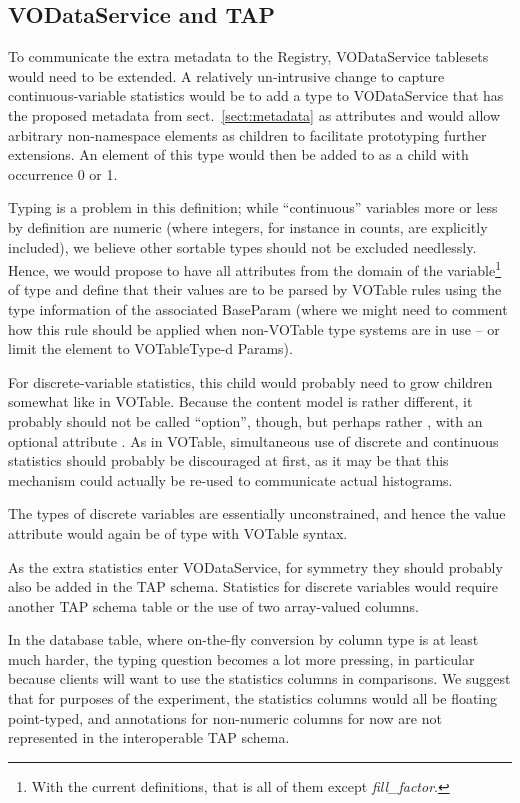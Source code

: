 \documentclass[11pt,a4paper]{ivoa}
\begin{document}
\subsection{VODataService and TAP}

To communicate the extra metadata to the Registry, VODataService
tablesets would need to be extended.  A relatively un-intrusive change
to capture continuous-variable statistics would be to add a type
 to VODataService that has the proposed metadata from
sect.~\ref{sect:metadata} as attributes and would allow arbitrary
non-namespace elements as children to facilitate prototyping further
extensions. An element of this type would then be added to
 as a  child with occurrence 0 or 1.

Typing is a problem in this definition; while ``continuous'' variables
more or less by definition are numeric (where integers, for instance in
counts, are explicitly included), we believe other sortable types should
not be excluded needlessly.  Hence, we would propose to have all
attributes from the domain of the variable\footnote{With the current
definitions, that is all of them except \emph{fill\_factor}.} of type
  and define that their values are to be parsed by
VOTable rules using the type information of the associated BaseParam
(where we might need to comment how this rule should be applied when
non-VOTable type systems are in use -- or limit the element to
VOTableType-d Params).

For discrete-variable statistics, this  child would
probably need to grow children somewhat like  in VOTable.
Because the content model is rather different, it probably should not be
called ``option'', though, but perhaps rather , with an
optional attribute .  As in VOTable, simultaneous use of
discrete and continuous statistics should probably be discouraged at
first, as it may be that this mechanism could actually be re-used to
communicate actual histograms.

The types of discrete variables are essentially unconstrained, and hence
the value attribute would again be of type  with VOTable
syntax.

As the extra statistics enter VODataService, for symmetry they should
probably also be added in the TAP schema.  Statistics for discrete
variables would require another TAP schema table or the use of two
array-valued columns.

In the database table, where on-the-fly conversion by column type is at
least much harder, the typing question becomes a lot more pressing, in
particular because clients will want to use the statistics columns in
comparisons.  We
suggest that for purposes of the experiment, the statistics columns
would all be floating point-typed, and annotations for non-numeric
columns for now are not represented in the interoperable TAP schema.
\end{document}
